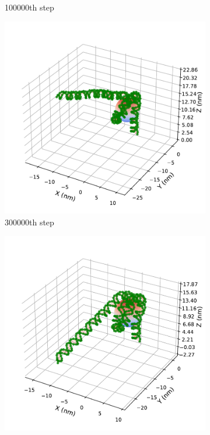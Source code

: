 \documentclass[a4paper,10pt]{article}
\begin{document}
\begin{figure}[tb]
\begin{subfigure}{.3\textwidth}
\caption{100000th step}
\label{fig:hist_b}
\end{subfigure}
\begin{subfigure}{.3\textwidth}
\includegraphics[width=\textwidth]{hist_300000.pdf}
\caption{300000th step}
\label{fig:hist_c}
\end{subfigure}
\begin{subfigure}{.3\textwidth}
\includegraphics[width=\textwidth]{hist_400000.pdf}

\end{subfigure}
\end{figure}
\end{document}
